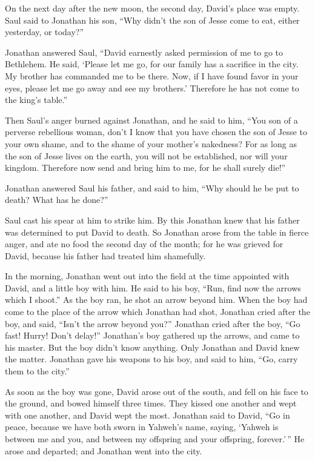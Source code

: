  On the next day after the new moon, the second day,
David's place was empty. Saul said to Jonathan his son, ``Why didn't the
son of Jesse come to eat, either yesterday, or today?''

 Jonathan answered Saul, ``David earnestly asked permission
of me to go to Bethlehem.  He said, `Please let me go, for
our family has a sacrifice in the city. My brother has commanded me to
be there. Now, if I have found favor in your eyes, please let me go away
and see my brothers.' Therefore he has not come to the king's table.''

 Then Saul's anger burned against Jonathan, and he said to
him, ``You son of a perverse rebellious woman, don't I know that you
have chosen the son of Jesse to your own shame, and to the shame of your
mother's nakedness?  For as long as the son of Jesse lives
on the earth, you will not be established, nor will your kingdom.
Therefore now send and bring him to me, for he shall surely die!''

 Jonathan answered Saul his father, and said to him, ``Why
should he be put to death? What has he done?''

 Saul cast his spear at him to strike him. By this Jonathan
knew that his father was determined to put David to death. 
So Jonathan arose from the table in fierce anger, and ate no food the
second day of the month; for he was grieved for David, because his
father had treated him shamefully.

 In the morning, Jonathan went out into the field at the
time appointed with David, and a little boy with him.  He
said to his boy, ``Run, find now the arrows which I shoot.'' As the boy
ran, he shot an arrow beyond him.  When the boy had come to
the place of the arrow which Jonathan had shot, Jonathan cried after the
boy, and said, ``Isn't the arrow beyond you?''  Jonathan
cried after the boy, ``Go fast! Hurry! Don't delay!'' Jonathan's boy
gathered up the arrows, and came to his master.  But the
boy didn't know anything. Only Jonathan and David knew the matter.
 Jonathan gave his weapons to his boy, and said to him,
``Go, carry them to the city.''

 As soon as the boy was gone, David arose out of the south,
and fell on his face to the ground, and bowed himself three times. They
kissed one another and wept with one another, and David wept the most.
 Jonathan said to David, ``Go in peace, because we have
both sworn in Yahweh's name, saying, `Yahweh is between me and you, and
between my offspring and your offspring, forever.'\,'' He arose and
departed; and Jonathan went into the city.

